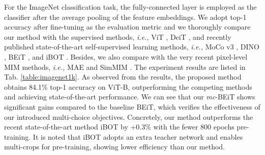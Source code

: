 \documentclass[runningheads]{llncs}
\begin{document}
For the ImageNet classification task, the fully-connected layer is employed as the classifier after the average pooling of the feature embeddings. We adopt top-1 accuracy after fine-tuning as the evaluation metric and we thoroughly compare our method with the supervised methods, \textit{i.e.,} ViT \cite{vit}, DeiT \cite{deit}, and recently published state-of-the-art self-supervised learning methods, \textit{i.e.,} MoCo v3 \cite{mocov3}, DINO \cite{dino}, BEiT \cite{beit}, and iBOT \cite{ibot}. Besides, we also compare with the very recent pixel-level MIM methods, \textit{i.e.,} MAE \cite{mae} and SimMIM \cite{simmim}. The experiment results are listed in Tab. \ref{table:imagenet1k}. As observed from the results, the proposed method obtains 84.1\% top-1 accuracy on ViT-B, outperforming the competing methods and achieving state-of-the-art performance. We can see that our \emph{mc}-BEiT shows significant gains compared to the baseline BEiT, which verifies the effectiveness of our introduced multi-choice objectives. Concretely, our method outperforms the recent state-of-the-art method iBOT \cite{ibot} by +0.3\% with the fewer 800 epochs pre-training. It is noted that iBOT adopts an extra teacher network and enables multi-crops for pre-training, showing lower efficiency than our method.




\begin{table}[h]

\small
\centering
\caption{The top-1 fine-tuning accuracy of ImageNet-1K using our \emph{mc}-BEiT with different training epochs and backbone architectures.}
\label{table:imagenet_epochs}
\end{table}
\end{document}
